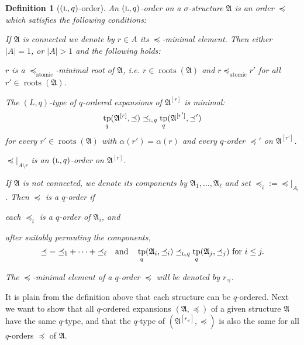 \documentclass[11pt]{article}
\newtheorem{definition}{Definition}
\newcommand{\logic}[1]{\textsc{#1}}
\newcommand{\logl}{\logic{l}}
\newcommand{\rela}[2]{\ensuremath{{#1|}_{#2}}}
\newcommand{\relao}[2]{\rela{#1\!}{#2}}
\DeclareMathOperator{\tp}{tp}
\newcommand{\struct}[1]{\mathfrak{#1}}
\newcommand{\AS}{\struct{A}}
\DeclareMathOperator{\tdroot}{roots}
\begin{document}
\begin{definition}[$(\logl,q)$-order]
  \label{def:q-order}
  An \emph{$(\logl,q)$-order} on a $\sigma$-structure $\AS$ is an
  order $\preceq$ which satisfies the following conditions:
  \begin{conditions}
  \item\label{def:q-order-connected} If $\AS$ is connected we denote
    by $r \in A$ its $\preceq$-minimal element. Then either
    $|A|=1$, or $|A|>1$ and the following holds:
    \begin{conditions}
    \item \label{def:q-orders-min-element-is-root} $r$ is a
      $\preceq_{\text{atomic}}$-minimal root of $\AS$, i.e. $r \in
      \tdroot(\AS)$ and $r \preceq_{\text{atomic}} r'$ for all $r' \in
      \tdroot(\AS)$.
    \item \label{def:q-orders-root-q-type} The $(L,q)$-type of
      $q$-ordered expansions of $\AS^{[r]}$ is minimal:
      \[
      \tp_q(\AS^{[r]},\preceq) \preceq_{\logl,q} \tp_q(\AS^{[r']},\preceq')
      \]
      for every $r' \in \tdroot(\AS)$ with $\alpha(r') = \alpha(r)$
      and every $q$-order $\preceq'$ on $\AS^{[r']}$.
    \item\label{def:q-order-connected-restriction}
      $\relao{\preceq}{A\setminus r}$ is an $(\logl,q)$-order on
      $\AS^{[r]}$.
    \end{conditions}
  \item\label{def:q-order-disconnected} If $\AS$ is not connected, we
    denote its components by $\AS_1,\ldots,\AS_\ell$ and set
    $\preceq_i := \relao{\preceq}{A_i}$. Then $\preceq$ is a $q$-order
    if
    \begin{conditions}
    \item each $\preceq_i$ is a $q$-order of $\AS_{i}$, and
    \item after suitably permuting the components,
      \[
      {\preceq} = {\preceq_1} + \cdots + {\preceq_{\ell}}
      \quad\text{and}\quad
      \tp_q(\AS_i,\preceq_i) \preceq_{\logl,q}
      \tp_q(\AS_j,\preceq_j)
      \text{ for }i \leq j.
      \]
    \end{conditions}
  \end{conditions}
  The $\preceq$-minimal element of a $q$-order $\preceq$ will be
  denoted by $r_{\preceq}$.
\end{definition}

It is plain from the definition above that each structure can be
$q$-ordered. Next we want to show that all $q$-ordered expansions
$(\AS,\preceq)$ of a given structure $\AS$ have the same $q$-type, and
that the $q$-type of $(\AS^{[r_\preceq]},\preceq)$ is also the same
for all $q$-orders $\preceq$ of $\AS$.
\end{document}
